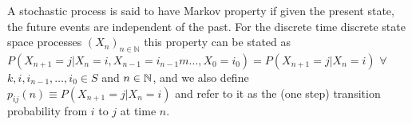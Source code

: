  A stochastic process is said to have Markov property if given the present state, the future events are independent of the past. For the discrete time discrete state space processes $(X_n)_{n \in \mathbb{N}}$ this property can be stated as $P(X_{n+1} = j | X_{n} = i, X_{n-1} = i_{n-1}m \ldots, X_{0} = i_{0}) = P(X_{n+1} = j | X_{n}=i)$ $\forall$ $k,i,i_{n-1},\ldots,i_0 \in S$ and $n \in \mathbb{N}$, and we also define $p_{ij}(n) \equiv P(X_{n+1} = j | X_n = {i})$ and refer to it as the (one step) transition probability from $i$ to $j$ at time $n$.